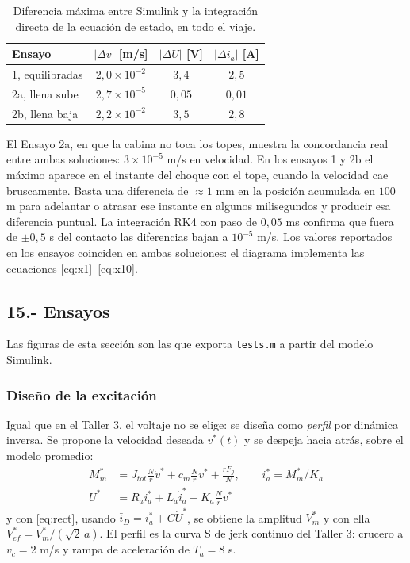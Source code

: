\documentclass[10pt,a4paper,twocolumn]{article}
\begin{document}
\begin{table}[H]
\centering
\caption{Diferencia máxima entre Simulink y la integración directa de la ecuación de
estado, en todo el viaje.}
\label{tab:verif}
\small
\begin{tabular}{@{}lccc@{}}
\toprule
Ensayo & $|\Delta v|$ [m/s] & $|\Delta U|$ [V] & $|\Delta i_a|$ [A] \\
\midrule
1, equilibradas & $2{,}0\times10^{-2}$ & $3{,}4$ & $2{,}5$ \\
2a, llena sube  & $2{,}7\times10^{-5}$ & $0{,}05$ & $0{,}01$ \\
2b, llena baja  & $2{,}2\times10^{-2}$ & $3{,}5$ & $2{,}8$ \\
\bottomrule
\end{tabular}
\end{table}

\noindent El Ensayo 2a, en que la cabina no toca los topes, muestra la concordancia real
entre ambas soluciones: $3\times10^{-5}$ m/s en velocidad. En los ensayos 1 y 2b el máximo
aparece en el instante del choque con el tope, cuando la velocidad cae bruscamente. Basta
una diferencia de $\approx 1$ mm en la posición acumulada en $100$ m para adelantar o
atrasar ese instante en algunos milisegundos y producir esa diferencia puntual. La
integración RK4 con paso de $0{,}05$ ms confirma que fuera de $\pm0{,}5$ s del contacto las
diferencias bajan a $10^{-5}$ m/s. Los valores reportados en los ensayos coinciden en ambas
soluciones: el diagrama implementa las ecuaciones \eqref{eq:x1}--\eqref{eq:x10}.

\subsection*{15.- Ensayos}

Las figuras de esta sección son las que exporta \texttt{tests.m} a partir del modelo
Simulink.

\subsubsection*{Diseño de la excitación}

Igual que en el Taller 3, el voltaje no se elige: se diseña como \emph{perfil} por dinámica
inversa. Se propone la velocidad deseada $v^*(t)$ y se despeja hacia atrás, sobre el modelo
promedio:
\begin{align*}
  M_m^* &= J_{tot}\tfrac{N}{r}\dot v^* + c_m\tfrac{N}{r} v^* + \tfrac{r F_g}{N}, \qquad
  i_a^* = M_m^*/K_a \\
  U^* &= R_a i_a^* + L_a \dot i_a^* + K_a\tfrac{N}{r} v^*
\end{align*}
y con \eqref{eq:rect}, usando $\bar i_D = i_a^* + C\dot U^*$, se obtiene la amplitud $V_m^*$
y con ella $V_{ef}^* = V_m^*/(\sqrt2\,a)$. El perfil es la curva S de jerk continuo del
Taller 3: crucero a $v_c = 2$ m/s y rampa de aceleración de $T_a = 8$ s.
\end{document}
